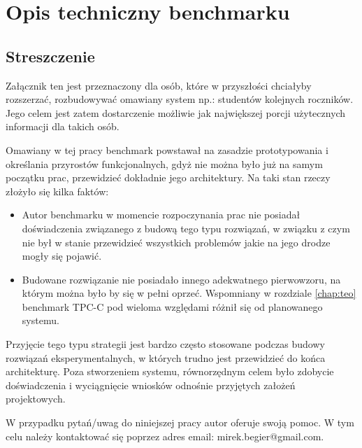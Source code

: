 \chapter{Opis techniczny benchmarku}
\section{Streszczenie}
Załącznik ten jest przeznaczony dla osób, które w przyszłości chciałyby rozszerzać,
rozbudowywać omawiany system np.: studentów kolejnych roczników. Jego celem jest zatem dostarczenie
możliwie jak największej porcji użytecznych informacji dla takich osób.

Omawiany w tej pracy benchmark powstawał na zasadzie prototypowania i określania przyrostów funkcjonalnych,
gdyż nie można było już na samym początku prac, przewidzieć dokładnie 
jego architektury. Na taki stan rzeczy złożyło się kilka faktów:
\begin{itemize}
\item Autor benchmarku w momencie rozpoczynania prac nie posiadał doświadczenia związanego z budową tego typu
rozwiązań, w związku z czym nie był w stanie przewidzieć wszystkich problemów jakie na jego drodze mogły się
pojawić.
\item Budowane rozwiązanie nie posiadało innego adekwatnego pierwowzoru, na którym można było by się w pełni oprzeć.
Wspomniany w rozdziale \ref{chap:teo} benchmark TPC-C pod wieloma względami różnił się od planowanego systemu.
\end{itemize}
Przyjęcie tego typu strategii jest bardzo często stosowane podczas budowy rozwiązań eksperymentalnych, 
w których trudno jest przewidzieć do końca architekturę. Poza stworzeniem systemu, równorzędnym celem 
było zdobycie doświadczenia i wyciągnięcie wniosków odnośnie przyjętych założeń projektowych.

W przypadku pytań/uwag do niniejszej pracy autor oferuje swoją pomoc. W tym celu należy kontaktować się 
poprzez adres email: mirek.begier@gmail.com.

